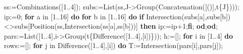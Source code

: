 \documentclass[
  10pt,
  letterpaper,
]{article}
\newenvironment{Shaded}{}{}
\newcommand{\BuiltInTok}[1]{\textcolor[rgb]{0.00,0.50,0.00}{#1}}
\newcommand{\ControlFlowTok}[1]{\textcolor[rgb]{0.00,0.44,0.13}{\textbf{#1}}}
\newcommand{\ExtensionTok}[1]{#1}
\newcommand{\FloatTok}[1]{\textcolor[rgb]{0.25,0.63,0.44}{#1}}
\newcommand{\NormalTok}[1]{#1}
\newcommand{\OperatorTok}[1]{\textcolor[rgb]{0.40,0.40,0.40}{#1}}
\newcommand{\VariableTok}[1]{\textcolor[rgb]{0.10,0.09,0.49}{#1}}
\begin{document}
\begin{Shaded}
\begin{Highlighting}[]
 \VariableTok{ss}\OperatorTok{:=}\BuiltInTok{Combinations}\NormalTok{([}\FloatTok{1}\OperatorTok{..}\FloatTok{4}\NormalTok{])}\OperatorTok{;}
 \VariableTok{subs}\OperatorTok{:=}\BuiltInTok{List}\NormalTok{(}\VariableTok{ss}\OperatorTok{,}\VariableTok{J}\OperatorTok{{-}\textgreater{}}\BuiltInTok{Group}\NormalTok{(}\BuiltInTok{Concatenation}\NormalTok{([()]}\OperatorTok{,}\VariableTok{t}\NormalTok{\{}\VariableTok{J}\NormalTok{\})))}\OperatorTok{;}
 \VariableTok{ip}\OperatorTok{:=}\FloatTok{0}\OperatorTok{;}
 \ControlFlowTok{for} \VariableTok{a} \ExtensionTok{in}\NormalTok{ [}\FloatTok{1}\OperatorTok{..}\FloatTok{16}\NormalTok{] }\ControlFlowTok{do} \ControlFlowTok{for} \VariableTok{b} \ExtensionTok{in}\NormalTok{ [}\FloatTok{1}\OperatorTok{..}\FloatTok{16}\NormalTok{] }\ControlFlowTok{do}
  \ControlFlowTok{if} \BuiltInTok{Intersection}\NormalTok{(}\VariableTok{subs}\NormalTok{[}\VariableTok{a}\NormalTok{]}\OperatorTok{,}\VariableTok{subs}\NormalTok{[}\VariableTok{b}\NormalTok{])}\OperatorTok{\textless{}\textgreater{}}\VariableTok{subs}\NormalTok{[}\BuiltInTok{Position}\NormalTok{(}\VariableTok{ss}\OperatorTok{,}\BuiltInTok{Intersection}\NormalTok{(}\VariableTok{ss}\NormalTok{[}\VariableTok{a}\NormalTok{]}\OperatorTok{,}\VariableTok{ss}\NormalTok{[}\VariableTok{b}\NormalTok{]))]}
   \ControlFlowTok{then} \VariableTok{ip}\OperatorTok{:=}\VariableTok{ip}\OperatorTok{+}\FloatTok{1}\OperatorTok{;}\ControlFlowTok{fi}\OperatorTok{;}
 \ControlFlowTok{od}\OperatorTok{;}\ControlFlowTok{od}\OperatorTok{;}
 \VariableTok{pars}\OperatorTok{:=}\BuiltInTok{List}\NormalTok{([}\FloatTok{1}\OperatorTok{..}\FloatTok{4}\NormalTok{]}\OperatorTok{,}\VariableTok{i}\OperatorTok{{-}\textgreater{}}\BuiltInTok{Group}\NormalTok{(}\VariableTok{t}\NormalTok{\{}\BuiltInTok{Difference}\NormalTok{([}\FloatTok{1}\OperatorTok{..}\FloatTok{4}\NormalTok{]}\OperatorTok{,}\NormalTok{[}\VariableTok{i}\NormalTok{])\}))}\OperatorTok{;}
 \VariableTok{h}\OperatorTok{:=}\NormalTok{[]}\OperatorTok{;}
 \ControlFlowTok{for} \VariableTok{i} \ExtensionTok{in}\NormalTok{ [}\FloatTok{1}\OperatorTok{..}\FloatTok{4}\NormalTok{] }\ControlFlowTok{do}
  \VariableTok{rows}\OperatorTok{:=}\NormalTok{[]}\OperatorTok{;}
  \ControlFlowTok{for} \VariableTok{j} \ExtensionTok{in} \BuiltInTok{Difference}\NormalTok{([}\FloatTok{1}\OperatorTok{..}\FloatTok{4}\NormalTok{]}\OperatorTok{,}\NormalTok{[}\VariableTok{i}\NormalTok{]) }\ControlFlowTok{do}
   \VariableTok{T}\OperatorTok{:=}\BuiltInTok{Intersection}\NormalTok{(}\VariableTok{pars}\NormalTok{[}\VariableTok{i}\NormalTok{]}\OperatorTok{,}\VariableTok{pars}\NormalTok{[}\VariableTok{j}\NormalTok{])}\OperatorTok{;}

\end{Highlighting}
\end{Shaded}
\end{document}
